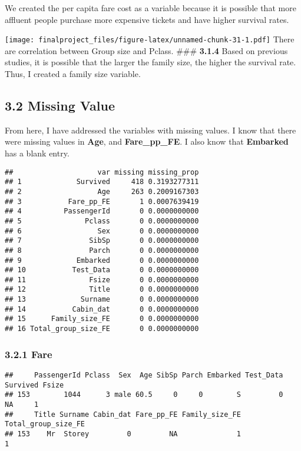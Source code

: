\documentclass[
]{article}
\begin{document}
We created the per capita fare cost as a variable because it is possible
that more affluent people purchase more expensive tickets and have
higher survival rates.

\texttt{[image: finalproject\_files/figure-latex/unnamed-chunk-31-1.pdf]}
There are correlation between Group size and Pclass. \#\#\#
\textbf{3.1.4} Based on previous studies, it is possible that the larger
the family size, the higher the survival rate. Thus, I created a family
size variable.

\hypertarget{missing-value}{%
\subsection{\texorpdfstring{\textbf{3.2 Missing
Value}}{3.2 Missing Value}}\label{missing-value}}

From here, I have addressed the variables with missing values. I know
that there were missing values in \textbf{Age}, and
\textbf{Fare\_pp\_FE}. I also know that \textbf{Embarked} has a blank
entry.

\begin{verbatim}
##                    var missing missing_prop
## 1             Survived     418 0.3193277311
## 2                  Age     263 0.2009167303
## 3           Fare_pp_FE       1 0.0007639419
## 4          PassengerId       0 0.0000000000
## 5               Pclass       0 0.0000000000
## 6                  Sex       0 0.0000000000
## 7                SibSp       0 0.0000000000
## 8                Parch       0 0.0000000000
## 9             Embarked       0 0.0000000000
## 10           Test_Data       0 0.0000000000
## 11               Fsize       0 0.0000000000
## 12               Title       0 0.0000000000
## 13             Surname       0 0.0000000000
## 14           Cabin_dat       0 0.0000000000
## 15      Family_size_FE       0 0.0000000000
## 16 Total_group_size_FE       0 0.0000000000
\end{verbatim}

\hypertarget{fare-1}{%
\subsubsection{\texorpdfstring{\textbf{3.2.1
Fare}}{3.2.1 Fare}}\label{fare-1}}

\begin{verbatim}
##     PassengerId Pclass  Sex  Age SibSp Parch Embarked Test_Data Survived Fsize
## 153        1044      3 male 60.5     0     0        S         0       NA     1
##     Title Surname Cabin_dat Fare_pp_FE Family_size_FE Total_group_size_FE
## 153    Mr  Storey         0         NA              1                   1
\end{verbatim}
\end{document}
